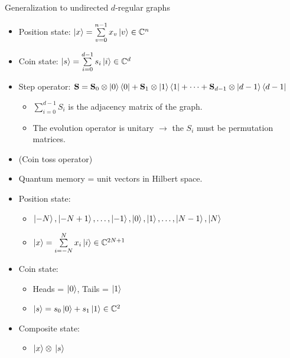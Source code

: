 \documentclass[aspectratio=169]{beamer}
\begin{document}
\begin{frame}{Generalization to undirected $d$-regular graphs}
\begin{itemize}
    \item Position state: $\ket{x} = \sum\limits_{v=0}^{n-1}x_v\ket{v} \in{} \mathbb{C}^{n}$ \pause
    \item Coin state: $\ket{s} = \sum\limits_{i=0}^{d-1}s_i\ket{i} \in{} \mathbb{C}^{d}$ \pause
    \item Step operator: $\mathbf{S} = \mathbf{S}_0\otimes \ket{0}\bra{0} + \mathbf{S}_1 \otimes\ket{1}\bra{1} + \dots + \mathbf{S}_{d-1}\otimes \ket{d-1}\bra{d-1}$
    \begin{itemize}
        \item $\sum\limits_{i=0}^{d-1}S_i$ is the adjacency matrix of the graph.
        \item The evolution operator is unitary $\rightarrow$ the $S_i$ must be permutation matrices.\pause
    \end{itemize}
    \item (Coin toss operator)
\end{itemize}


\begin{itemize}
    \item Quantum memory = unit vectors in Hilbert space. \pause
    \item Position state: \pause
    \begin{itemize}
        \item $\ket{-N},\ket{-N+1},\dots,\ket{-1},\ket{0},\ket{1},\dots,\ket{N-1},\ket{N}$ \pause
        \item $\ket{x} = \sum\limits_{i=-N}^{N}x_i\ket{i} \in{} \mathbb{C}^{2N+1}$ \pause
    \end{itemize}
    \item Coin state: \pause
    \begin{itemize}
        \item Heads = $\ket{0}$, Tails = $\ket{1}$ \pause
        \item $\ket{s} = s_0 \ket{0} + s_1 \ket{1} \in \mathbb{C}^2$ \pause
    \end{itemize}
    \item Composite state: \pause
    \begin{itemize}
        \item $\ket{x}\otimes{}\ket{s}$
    \end{itemize}
\end{itemize}
\end{frame}
\end{document}

